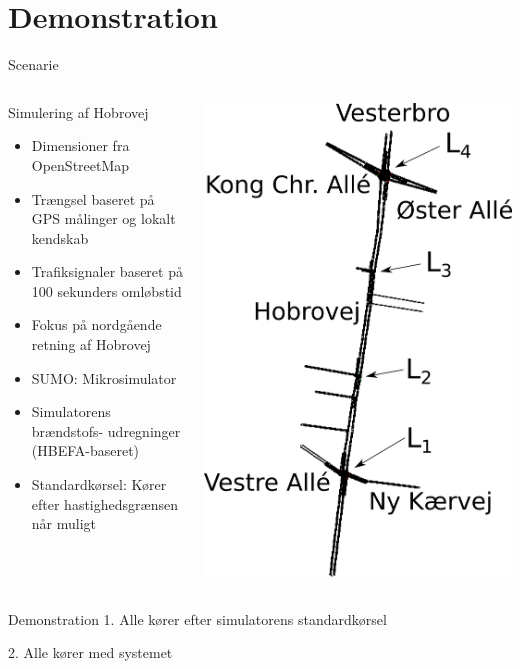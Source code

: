 \section{Demonstration}
\begin{frame}{Scenarie}
\begin{columns}
\begin{column}{0.6\textwidth}
Simulering af Hobrovej
\begin{itemize}
\item Dimensioner fra OpenStreetMap
\item Trængsel baseret på GPS målinger og lokalt kendskab
\item Trafiksignaler baseret på 100 sekunders omløbstid
\item Fokus på nordgående retning af Hobrovej
\item SUMO: Mikrosimulator
\item Simulatorens brændstofs- udregninger (HBEFA-baseret)
\item Standardkørsel: Kører efter hastighedsgrænsen når muligt
\end{itemize}
\end{column}

\begin{column}{0.4\textwidth}
\includegraphics[width=1\textwidth]{../images/HobrovejL.png}
\end{column}
\end{columns}
\end{frame}

\begin{frame}{Demonstration}
1. Alle kører efter simulatorens standardkørsel
\vspace{4mm}

2. Alle kører med systemet
\end{frame}